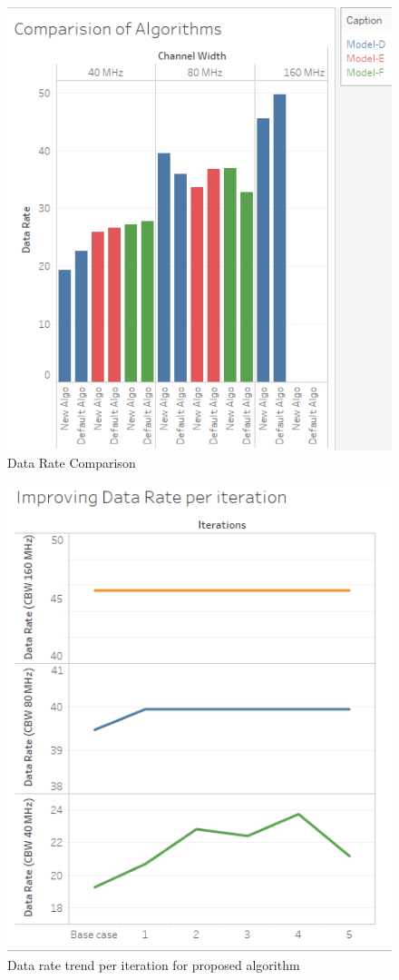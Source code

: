 \documentclass[a4paper, 10pt, conference]{ieeeconf}
\begin{document}
\begin{figure}[h]
      	\centering
     	\includegraphics[scale=0.55]{AlgoComparision.png}
      	\caption{Data Rate Comparison}
      	\label{Fig. 1}
\end{figure}


\begin{figure}[h]
      	\centering
     	\includegraphics[scale=0.55]{DataRateVsIterations.png}
      	\caption{Data rate trend per iteration for proposed algorithm }
      	\label{Fig. 2}
\end{figure}
\end{document}

